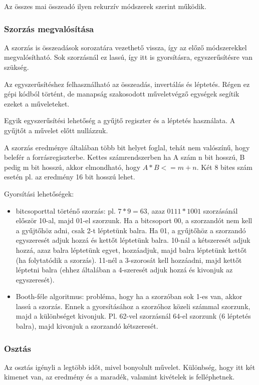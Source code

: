 Az összes mai összeadó ilyen rekurzív módszerek szerint működik.

\subsubsection{Szorzás megvalósítása}
A szorzás is összeadások sorozatára vezethető vissza, így az előző módszerekkel megvalósítható.
Sok szorzásnál ez lassú, így itt is gyorsításra, egyszerűsítésre van szükség.

Az egyszerűsítéshez felhasználható az összeadás, invertálás és léptetés.
Régen ez gépi kódból történt, de manapság szakosodott műveletvégző egységek segítik ezeket a műveleteket.

Egyik egyszerűsítési lehetőség a gyűjtő regiszter és a léptetés használata.
A gyűjtőt a művelet előtt nullázzuk.

A szorzás eredménye általában több bit helyet foglal, tehát nem valószínű, hogy belefér a forrásregiszterbe.
Kettes számrendszerben ha A szám n bit hosszú, B pedig m bit hosszú, akkor elmondható, hogy $A*B <= m+n$.
Két 8 bites szám esetén pl. az eredmény 16 bit hosszú lehet.

Gyorsítási lehetőségek:
\begin{itemize}
    \item bitcsoporttal történő szorzás: pl. $7*9=63$, azaz $0111*1001$ szorzásánál először 10-al, majd 01-el szorzunk. Ha a bitcsoport 00, a szorzandót nem kell a gyűjtőhöz adni, csak 2-t léptetünk balra. Ha 01, a gyűjtőhöz a szorzandó egyszeresét adjuk hozzá és kettőt léptetünk balra. 10-nál a kétszeresét adjuk hozzá, azaz balra léptetünk egyet, hozzáadjuk, majd balra léptetünk kettőt (ha folytatódik a szorzás). 11-nél a 3-szorosát kell hozzáadni, majd kettőt léptetni balra (ehhez általában a 4-szeresét adjuk hozzá és kivonjuk az egyszeresét).
    \item Booth-féle algoritmus: probléma, hogy ha a szorzóban sok 1-es van, akkor lassú a szorzás. Ennek a gyorsításához a szorzóhoz közeli számmal szorzunk, majd a különbséget kivonjuk. Pl. 62-vel szorzásnál 64-el szorzunk (6 léptetés balra), majd kivonjuk a szorzandó kétszeresét.
\end{itemize}

\subsubsection{Osztás}
Az osztás igényli a legtöbb időt, mivel bonyolult művelet.
Különbség, hogy itt két kimenet van, az eredmény és a maradék, valamint kivételek is felléphetnek.


